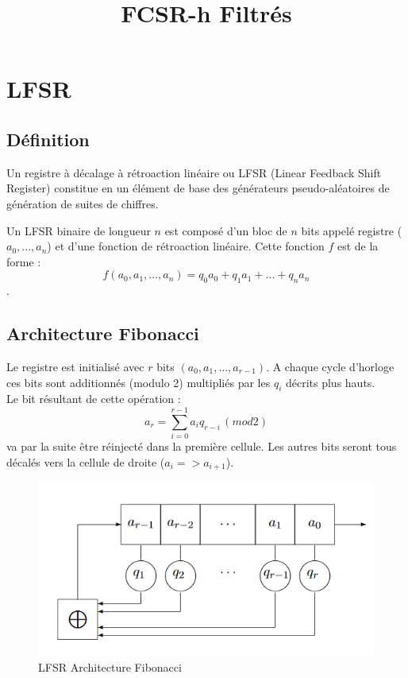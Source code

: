 \documentclass[11pt]{report}
\begin{document}
\title{FCSR-h Filtrés}
\maketitle

    
\chapter{LFSR}
	\section{Définition}
	Un registre à décalage à rétroaction linéaire ou LFSR (Linear Feedback Shift Register) constitue en un élément de base des générateurs pseudo-aléatoires de génération de suites de chiffres.
	
	Un LFSR binaire de longueur $n$ est composé d'un bloc de $n$ bits appelé registre  ($a_0,...,a_n$) et d'une fonction de rétroaction linéaire.
	Cette fonction $f$ est de la forme : 
	\[
	f(a_0,a_1,...,a_n)=q_0a_0+q_1a_1+...+q_na_n
	\].
	
	\section{Architecture Fibonacci}
	Le registre est initialisé avec $r$ bits $(a_0,a_1,...,a_{r-1})$. A chaque cycle d'horloge ces bits sont additionnés (modulo 2) multipliés par les $q_i$ décrits plus hauts. \\Le bit résultant de cette opération : \\
	\[
	a_r = \sum_{i=0}^{r-1} a_iq_{r-i}\,(mod 2)
	\]
	va par la suite être réinjecté dans la première cellule. Les autres bits seront tous décalés vers la cellule de droite ($a_i => a_{i+1}$).
	\begin{figure}[!h]
	\centering
	\includegraphics{FIBOLfsr.png}
	\caption{LFSR Architecture Fibonacci}
	\label{LFSRFibo}
	\end{figure}
	\\
	\\\\\\\\
	
\end{document}
